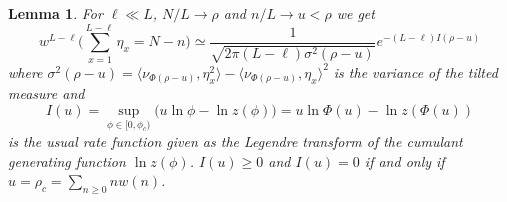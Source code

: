 \documentclass[pdflatex,sn-mathphys-num]{sn-jnl}%
\theoremstyle{thmstyleone}%
\newtheorem{lemma}[theorem]{Lemma}%
\theoremstyle{thmstyletwo}%
\theoremstyle{thmstylethree}%
\begin{document}
\begin{lemma}\label{lemma_binomexp}
For $\ell\ll L$, $N/L\to\rho$ and $n/L\to u<\rho$ we get
    \[
    w^{L-\ell} \Big(\sum_{x=1}^{L-\ell} \eta_x =N-n\Big) \simeq \frac{1}{\sqrt{2\pi (L-\ell )\sigma^2 (\rho -u)}} e^{-(L-\ell )I(\rho -u)}    
    \]
    where $\sigma^2 (\rho -u)=\langle \nu_{\Phi (\rho -u)} ,\eta_x^2 \rangle -\langle\nu_{\Phi (\rho -u)} ,\eta_x \rangle^2$ is the variance of the tilted measure and
    \[
        I(u)=\sup_{\phi\in [0,\phi_c )} \big( u\ln\phi -\ln z(\phi )\big) =u\ln\Phi (u)-\ln z(\Phi (u))
    \]
    is the usual rate function given as the Legendre transform of the cumulant generating function $\ln z(\phi )$. $I(u)\geq 0$ and $I(u)=0$ if and only if $u=\rho_c =\sum_{n\geq 0} nw(n)$.
\end{lemma}
\end{document}
